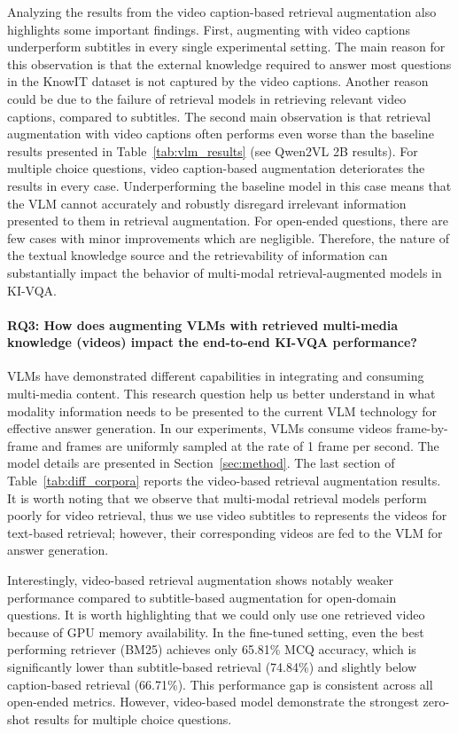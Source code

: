 Analyzing the results from the video caption-based retrieval augmentation also highlights some important findings. First, augmenting with video captions underperform subtitles in every single experimental setting. The main reason for this observation is that the external knowledge required to answer most questions in the KnowIT dataset is not captured by the video captions. Another reason could be due to the failure of retrieval models in retrieving relevant video captions, compared to subtitles. The second main observation is that retrieval augmentation with video captions often performs even worse than the baseline results presented in Table~\ref{tab:vlm_results} (see Qwen2VL 2B results). For multiple choice questions, video caption-based augmentation deteriorates the results in every case. Underperforming the baseline model in this case means that the VLM cannot accurately and robustly disregard irrelevant information presented to them in retrieval augmentation. For open-ended questions, there are few cases with minor improvements which are negligible. Therefore, the nature of the textual knowledge source and the retrievability of information can substantially impact the behavior of multi-modal retrieval-augmented models in KI-VQA.


\paragraph{\textbf{RQ3: How does augmenting VLMs with retrieved multi-media knowledge (videos) impact the end-to-end KI-VQA performance?}}
VLMs have demonstrated different capabilities in integrating and consuming multi-media content. This research question help us better understand in what modality information needs to be presented to the current VLM technology for effective answer generation. In our experiments, VLMs consume videos frame-by-frame and frames are uniformly sampled at the rate of 1 frame per second. The model details are presented in Section~\ref{sec:method}. The last section of Table~\ref{tab:diff_corpora} reports the video-based retrieval augmentation results. It is worth noting that we observe that multi-modal retrieval models perform poorly for video retrieval, thus we use video subtitles to represents the videos for text-based retrieval; however, their corresponding videos are fed to the VLM for answer generation. 

Interestingly, video-based retrieval augmentation shows notably weaker performance compared to subtitle-based augmentation for open-domain questions.  It is worth highlighting that we could only use one retrieved video because of GPU memory availability. In the fine-tuned setting, even the best performing retriever (BM25) achieves only 65.81\% MCQ accuracy, which is significantly lower than subtitle-based retrieval (74.84\%) and slightly below caption-based retrieval (66.71\%). This performance gap is consistent across all open-ended metrics. However, video-based model demonstrate the strongest zero-shot results for multiple choice questions.

